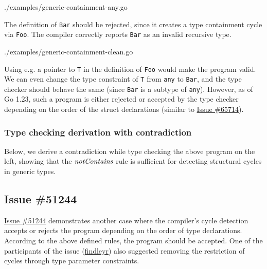\documentclass[12pt]{article}
\begin{document}
\noindent\begin{minipage}[t]{.45\linewidth}
    
    {./examples/generic-containment-any.go}

    The definition of \texttt{Bar} should be rejected, since it creates a type
    containment cycle via \texttt{Foo}. The compiler correctly reports \texttt{Bar}
    as an invalid recursive type.
\end{minipage}
\hfill
\noindent\begin{minipage}[t]{.45\linewidth}
    
    {./examples/generic-containment-clean.go}

    Using e.g. a pointer to \texttt{T} in the definition of \texttt{Foo} would
    make the program valid. We can even change the type constraint of \texttt{T}
    from \texttt{any} to \texttt{Bar}, and the type checker should behave the
    same (since \texttt{Bar} is a subtype of \texttt{any}). However, as of Go
    1.23, such a program is either rejected or accepted by the type checker
    depending on the order of the struct declarations (similar to
    \href{https://github.com/golang/go/issues/65714}{Issue \#65714}).

\end{minipage}

\subsubsection{Type checking derivation with contradiction}

Below, we derive a contradiction while type checking the above program on the
left, showing that the $\mathit{notContains}$ rule is sufficient for detecting structural
cycles in generic types.



\subsection{Issue \#51244}

\href{https://github.com/golang/go/issues/51244}{Issue \#51244} demonstrates
another case where the compiler's cycle detection accepts or rejects the program
depending on the order of type declarations. According to the above defined
rules, the program should be accepted. One of the participants of the issue
(\href{https://github.com/findleyr}{findleyr}) also suggested removing the
restriction of cycles through type parameter constraints.
\end{document}

